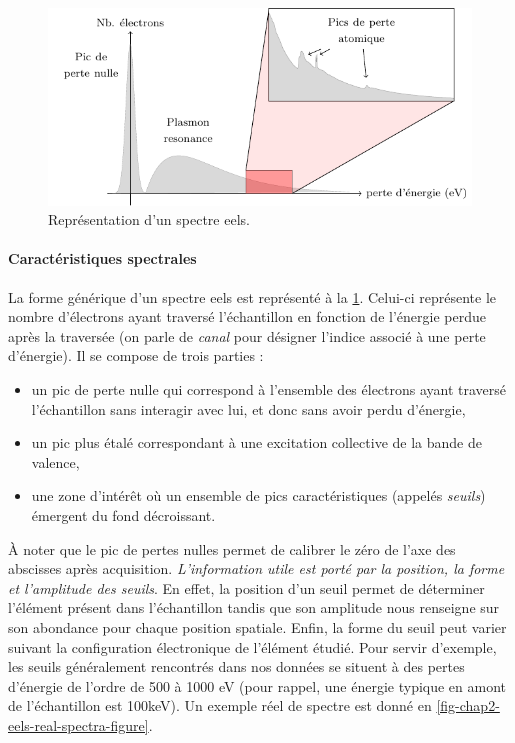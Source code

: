     \begin{figure}[t]
        \centering
        \includegraphics[]{img/chapitre2/figure5/eels-spectrum-shape.pdf}
        \caption{Représentation d'un spectre \gls{eels}.}
        \label{fig-chap2-eels-spectrum-shape}
    \end{figure}

    \paragraph{Caractéristiques spectrales} La forme générique d'un spectre \gls{eels} est représenté à la \cref{fig-chap2-eels-spectrum-shape}. Celui-ci représente le nombre d'électrons ayant traversé l'échantillon en fonction de l'énergie perdue après la traversée (on parle de \emph{canal} pour désigner l'indice associé à une perte d'énergie). Il se compose de trois parties :
    \begin{itemize}
    	\item un pic de perte nulle qui correspond à l'ensemble des électrons ayant traversé l'échantillon sans interagir avec lui, et donc sans avoir perdu d'énergie,
    	\item un pic plus étalé correspondant à une excitation collective de la bande de valence,
    	\item une zone d'intérêt où un ensemble de pics caractéristiques (appelés \emph{seuils}) émergent du fond décroissant.
    \end{itemize}
    \`A noter que le pic de pertes nulles permet de calibrer le zéro de l'axe des abscisses après acquisition. \emph{L'information utile est porté par la position, la forme et l'amplitude des seuils}. En effet, la position d'un seuil permet de déterminer l'élément présent dans l'échantillon tandis que son amplitude nous renseigne sur son abondance pour chaque position spatiale. Enfin, la forme du seuil peut varier suivant la configuration électronique de l'élément étudié.
    Pour servir d'exemple, les seuils généralement rencontrés dans nos données se situent à des pertes d'énergie de l'ordre de 500 à 1000 eV (pour rappel, une énergie typique en amont de l'échantillon est 100keV).
    Un exemple réel de spectre est donné en \cref{fig-chap2-eels-real-spectra-figure}.


